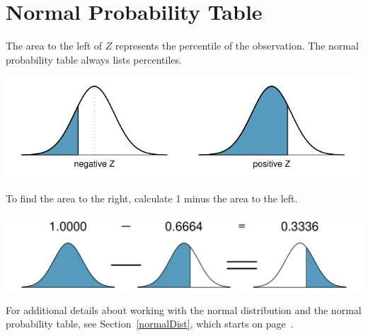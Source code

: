 \section{Normal Probability Table}
\label{normalProbabilityTable}

The area to the left of $Z$ represents the percentile of the observation. The normal probability table always lists percentiles.
\begin{center}
\includegraphics[height=1.5in]{extraTeX/appendix/figures/normalTails/normalTails}
\end{center}
To find the area to the right, calculate 1 minus the area to the left.\vspace{1mm}
\begin{center}
\includegraphics[height=1.1in]{extraTeX/appendix/figures/normalTails/subtractingArea/subtractingArea}\vspace{3mm}
\end{center}
For additional details about working with the normal distribution and the normal probability table, see Section~\ref{normalDist}, which starts on page~\pageref{normalDist}.


